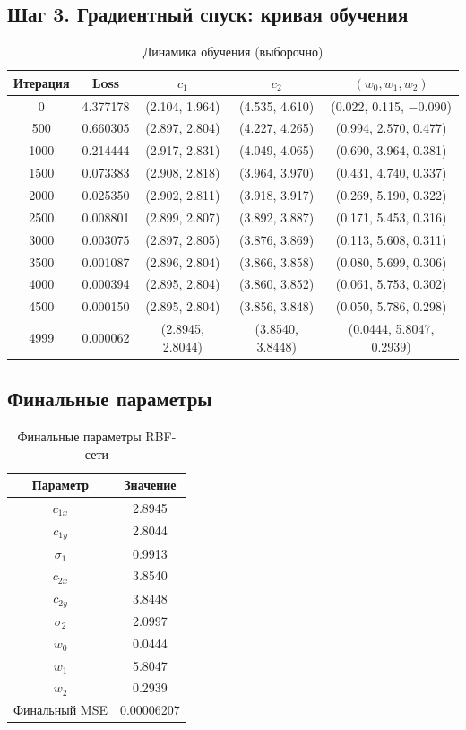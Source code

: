 \documentclass[12pt,a4paper]{article}
\begin{document}
\subsection{Шаг 3. Градиентный спуск: кривая обучения}

\begin{table}[H]
\centering
\caption{Динамика обучения (выборочно)}
\begin{tabular}{ccccc}
\toprule
Итерация & Loss & $c_1$ & $c_2$ & $(w_0, w_1, w_2)$ \\
\midrule
0    & 4.377178 & (2.104, 1.964) & (4.535, 4.610) & (0.022, 0.115, $-$0.090) \\
500  & 0.660305 & (2.897, 2.804) & (4.227, 4.265) & (0.994, 2.570, 0.477) \\
1000 & 0.214444 & (2.917, 2.831) & (4.049, 4.065) & (0.690, 3.964, 0.381) \\
1500 & 0.073383 & (2.908, 2.818) & (3.964, 3.970) & (0.431, 4.740, 0.337) \\
2000 & 0.025350 & (2.902, 2.811) & (3.918, 3.917) & (0.269, 5.190, 0.322) \\
2500 & 0.008801 & (2.899, 2.807) & (3.892, 3.887) & (0.171, 5.453, 0.316) \\
3000 & 0.003075 & (2.897, 2.805) & (3.876, 3.869) & (0.113, 5.608, 0.311) \\
3500 & 0.001087 & (2.896, 2.804) & (3.866, 3.858) & (0.080, 5.699, 0.306) \\
4000 & 0.000394 & (2.895, 2.804) & (3.860, 3.852) & (0.061, 5.753, 0.302) \\
4500 & 0.000150 & (2.895, 2.804) & (3.856, 3.848) & (0.050, 5.786, 0.298) \\
4999 & 0.000062 & (2.8945, 2.8044) & (3.8540, 3.8448) & (0.0444, 5.8047, 0.2939) \\
\bottomrule
\end{tabular}
\end{table}

\subsection{Финальные параметры}

\begin{table}[H]
\centering
\caption{Финальные параметры RBF-сети}
\begin{tabular}{cc}
\toprule
Параметр & Значение \\
\midrule
$c_{1x}$ & 2.8945 \\
$c_{1y}$ & 2.8044 \\
$\sigma_1$ & 0.9913 \\
$c_{2x}$ & 3.8540 \\
$c_{2y}$ & 3.8448 \\
$\sigma_2$ & 2.0997 \\
$w_0$ & 0.0444 \\
$w_1$ & 5.8047 \\
$w_2$ & 0.2939 \\
Финальный MSE & 0.00006207 \\
\bottomrule
\end{tabular}
\end{table}
\end{document}
